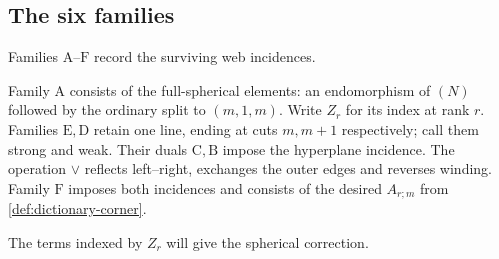 \documentclass[a4paper,11pt]{amsart}
\numberwithin{equation}{subsection}
\theoremstyle{plain}
\theoremstyle{definition}
\theoremstyle{remark}
\begin{document}
\subsection{The six families}

Families $\mathrm A$--$\mathrm F$ record the surviving web incidences.

\begin{definition}\label{def:six-families}
Family $\mathrm A$ consists of the full-spherical elements:
an endomorphism of $(N)$ followed by the ordinary split to $(m,1,m)$.
Write $Z_r$ for its index at rank $r$.
Families $\mathrm E,\mathrm D$ retain one line, ending at cuts
$m,m+1$ respectively; call them strong and weak.
Their duals $\mathrm C,\mathrm B$ impose the hyperplane incidence.
The operation $\vee$ reflects left--right, exchanges the outer
edges and reverses winding. Family $\mathrm F$ imposes both
incidences and consists of the desired $A_{r;m}$
from \autoref{def:dictionary-corner}.
\end{definition}

The terms indexed by $Z_r$ will give the spherical correction.
\end{document}
